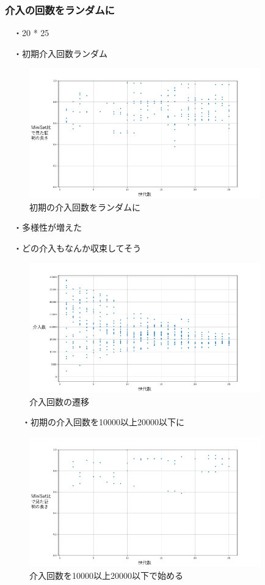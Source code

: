 \subsubsection{介入の回数をランダムに}

　・20 * 25

　・初期介入回数ランダム

\begin{figure}[h]
    \centering
    \includegraphics[width=10cm]{figures/Experiment1/3.png}
    \caption{初期の介入回数をランダムに}
\end{figure}

　・多様性が増えた

　・どの介入もなんか収束してそう

\begin{figure}[h]
    \centering
    \includegraphics[width=10cm]{figures/Experiment1/3-1.png}
    \caption{介入回数の遷移}
\end{figure}

　　・初期の介入回数を10000以上20000以下に

\begin{figure}[h]
    \centering
    \includegraphics[width=10cm]{figures/Experiment1/3-2.png}
    \caption{介入回数を10000以上20000以下で始める}
\end{figure}

